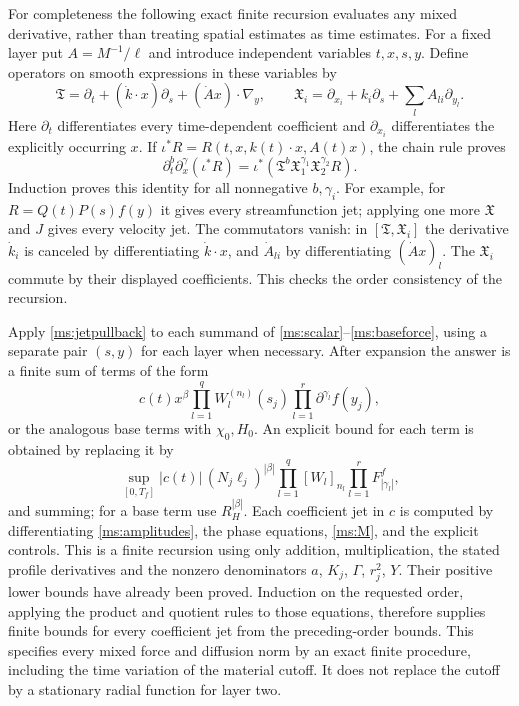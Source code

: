 For completeness the following exact finite recursion evaluates any
mixed derivative, rather than treating spatial estimates as time
estimates. For a fixed layer put $A=M^{-1}/\ell$ and introduce
independent variables $t,x,s,y$. Define operators on smooth
expressions in these variables by
\begin{equation}\label{ms:jetops}
 \mathfrak T=\partial_t+(\dot k\cdot x)\partial_s
                          +(\dot A x)\cdot\nabla_y,
 \qquad
 \mathfrak X_i=\partial_{x_i}+k_i\partial_s+
                              \sum_l A_{li}\partial_{y_l}.
\end{equation}
Here $\partial_t$ differentiates every time-dependent coefficient
and $\partial_{x_i}$ differentiates the explicitly occurring $x$.
If $\iota^*R=R(t,x,k(t)\cdot x,A(t)x)$, the chain rule proves
\begin{equation}\label{ms:jetpullback}
 \partial_t^b\partial_x^\gamma(\iota^*R)
       =\iota^*(\mathfrak T^b\mathfrak X_1^{\gamma_1}
                                         \mathfrak X_2^{\gamma_2}R).
\end{equation}
Induction proves this identity for all nonnegative $b,\gamma_i$.
For example, for $R=Q(t)P(s)f(y)$ it gives every streamfunction
jet; applying one more $\mathfrak X$ and $J$ gives every velocity
jet. The commutators vanish: in $[\mathfrak T,\mathfrak X_i]$
the derivative $\dot k_i$ is canceled by differentiating
$\dot k\cdot x$, and $\dot A_{li}$ by differentiating
$(\dot A x)_l$. The $\mathfrak X_i$ commute by their displayed
coefficients. This checks the order consistency of the recursion.

Apply \eqref{ms:jetpullback} to each summand of
\eqref{ms:scalar}--\eqref{ms:baseforce}, using a separate pair
$(s,y)$ for each layer when necessary. After expansion the answer
is a finite sum of terms of the form
\[
 c(t)x^\beta\prod_{l=1}^q W_l^{(n_l)}(s_j)
                         \prod_{l=1}^r\partial^{\gamma_l}f(y_j),
\]
or the analogous base terms with $\chi_0,H_0$. An explicit bound
for each term is obtained by replacing it by
\[
 \sup_{[0,T_f]}|c(t)|\,(N_j\ell_j)^{|\beta|}
          \prod_{l=1}^q[W_l]_{n_l}
          \prod_{l=1}^r F^f_{|\gamma_l|},
\]
and summing; for a base term use $R_H^{|\beta|}$.
Each coefficient jet in $c$ is computed by differentiating
\eqref{ms:amplitudes}, the phase equations, \eqref{ms:M}, and
the explicit controls. This is a finite recursion using only
addition, multiplication, the stated profile derivatives and the
nonzero denominators $a$, $K_j$, $\Gamma$, $r_j^2$, $Y$.
Their positive lower bounds have already been proved. Induction
on the requested order, applying the product and quotient rules
to those equations, therefore supplies finite bounds for every
coefficient jet from the preceding-order bounds. This specifies
every mixed force and diffusion norm by an exact finite procedure,
including the time variation of the material cutoff. It does not
replace the cutoff by a stationary radial function for layer two.

